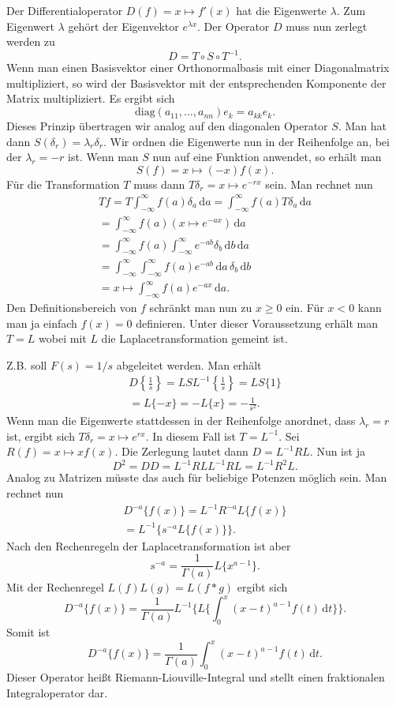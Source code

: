 \documentclass[a4paper,10pt,fleqn,twocolumn,twoside]{article}
\begin{document}
Der Differentialoperator \(D(f)=x\mapsto f'(x)\) hat die
Eigenwerte \(\lambda\). Zum Eigenwert \(\lambda\) gehört der
Eigenvektor \(e^{\lambda x}\). Der Operator \(D\) muss nun zerlegt
werden zu
\[D=T\circ S\circ T^{-1}.\]
Wenn man einen Basisvektor einer Orthonormalbasis mit einer
Diagonalmatrix multipliziert, so wird der Basisvektor mit der
entsprechenden Komponente der Matrix multipliziert. Es ergibt sich
\[\mathrm{diag}(a_{11},\ldots,a_{nn})e_k = a_{kk}e_k.\]
Dieses Prinzip übertragen wir analog auf den diagonalen
Operator \(S\). Man hat dann \(S(\delta_r) = \lambda_r \delta_r\).
Wir ordnen die Eigenwerte nun in der Reihenfolge an, bei der
\(\lambda_r=-r\) ist. Wenn man \(S\) nun auf eine Funktion anwendet,
so erhält man
\[S(f) = x\mapsto (-x)f(x).\]
Für die Transformation \(T\) muss dann
\(T\delta_r = x\mapsto e^{-rx}\) sein.
Man rechnet nun
\begin{gather*}
Tf = T\int_{-\infty}^{\infty} f(a)\delta_a\,\mathrm da
= \int_{-\infty}^{\infty} f(a)T\delta_a\,\mathrm da\\
= \int_{-\infty}^{\infty} f(a)(x\mapsto e^{-ax})\,\mathrm da\\
= \int_{-\infty}^{\infty} f(a)\int_{-\infty}^{\infty} e^{-ab}\delta_b
\,\mathrm db\,\mathrm da\\
= \int_{-\infty}^{\infty}\int_{-\infty}^{\infty} f(a)e^{-ab}
\,\mathrm da\,\delta_b\,\mathrm db\\
= x\mapsto \int_{-\infty}^{\infty} f(a)e^{-ax}\,\mathrm da.
\end{gather*}
Den Definitionsbereich von \(f\) schränkt man nun zu \(x\ge 0\) ein.
Für \(x<0\) kann man ja einfach \(f(x)=0\) definieren. Unter dieser
Voraussetzung erhält man \(T=L\) wobei mit \(L\) die
Laplacetransformation gemeint ist.

Z.B. soll \(F(s)=1/s\) abgeleitet werden. Man erhält
\begin{gather*}
D\left\{\frac{1}{s}\right\}
= LSL^{-1}\left\{\frac{1}{s}\right\} = LS\{1\}\\
= L\{-x\} = -L\{x\} = -\frac{1}{s^2}.
\end{gather*}
Wenn man die Eigenwerte stattdessen in der Reihenfolge anordnet,
dass \(\lambda_r=r\) ist, ergibt sich
\(T\delta_r=x\mapsto e^{rx}\). In diesem Fall ist \(T=L^{-1}\).
Sei \(R(f)=x\mapsto xf(x)\). Die Zerlegung lautet dann
\(D=L^{-1}RL\). Nun ist ja
\[D^2 = DD = L^{-1}RLL^{-1}RL = L^{-1}R^2L.\]
Analog zu Matrizen müsste das auch für beliebige Potenzen möglich
sein. Man rechnet nun
\begin{gather*}
D^{-a}\{f(x)\} = L^{-1}R^{-a}L\{f(x)\}\\
= L^{-1}\{s^{-a}L\{f(x)\}\}.
\end{gather*}
Nach den Rechenregeln der Laplacetransformation ist aber
\[s^{-a} = \frac{1}{\Gamma(a)}L\{x^{a-1}\}.\]
Mit der Rechenregel \(L(f)L(g) = L(f*g)\) ergibt sich
\[D^{-a}\{f(x)\}
= \frac{1}{\Gamma(a)}L^{-1}
\{L\{\int_0^x (x-t)^{a-1}f(t)\,\mathrm dt\}\}.\]
Somit ist
\[D^{-a}\{f(x)\}
= \frac{1}{\Gamma(a)}
\int_0^x (x-t)^{a-1}f(t)\,\mathrm dt.\]
Dieser Operator heißt Riemann-Liouville-Integral und stellt
einen fraktionalen Integraloperator dar.
\end{document}
